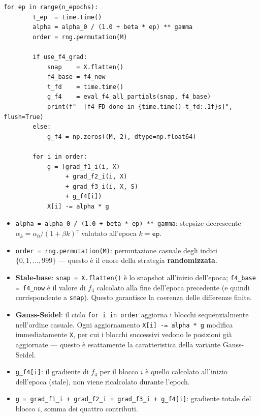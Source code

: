 \documentclass[12pt,a4paper]{article}
\theoremstyle{definition}
\begin{document}
\begin{lstlisting}[caption={Righe 269–290 — Loop principale: un'epoca}]
    for ep in range(n_epochs):
        t_ep  = time.time()
        alpha = alpha_0 / (1.0 + beta * ep) ** gamma
        order = rng.permutation(M)

        if use_f4_grad:
            snap    = X.flatten()
            f4_base = f4_now
            t_fd    = time.time()
            g_f4    = eval_f4_all_partials(snap, f4_base)
            print(f"  [f4 FD done in {time.time()-t_fd:.1f}s]", flush=True)
        else:
            g_f4 = np.zeros((M, 2), dtype=np.float64)

        for i in order:
            g = (grad_f1_i(i, X)
                 + grad_f2_i(i, X)
                 + grad_f3_i(i, X, S)
                 + g_f4[i])
            X[i] -= alpha * g
\end{lstlisting}

\begin{itemize}[nosep]
  \item \texttt{alpha = alpha\_0 / (1.0 + beta * ep) ** gamma}: stepsize decrescente
        $\alpha_k = \alpha_0 / (1 + \beta k)^\gamma$ valutato all'epoca $k = \texttt{ep}$.
  \item \texttt{order = rng.permutation(M)}: permutazione casuale degli indici
        $\{0, 1, \ldots, 999\}$ — questo è il cuore della strategia \textbf{randomizzata}.
  \item \textbf{Stale-base}: \texttt{snap = X.flatten()} è lo snapshot all'inizio dell'epoca;
        \texttt{f4\_base = f4\_now} è il valore di $f_4$ calcolato alla fine dell'epoca precedente
        (e quindi corrispondente a \texttt{snap}). Questo garantisce la coerenza delle differenze
        finite.
  \item \textbf{Gauss-Seidel}: il ciclo \texttt{for i in order} aggiorna i blocchi
        sequenzialmente nell'ordine casuale. Ogni aggiornamento \texttt{X[i] -= alpha * g}
        modifica immediatamente \texttt{X}, per cui i blocchi successivi vedono le posizioni
        già aggiornate — questo è esattamente la caratteristica della variante Gauss-Seidel.
  \item \texttt{g\_f4[i]}: il gradiente di $f_4$ per il blocco $i$ è quello calcolato
        all'inizio dell'epoca (stale), non viene ricalcolato durante l'epoch.
  \item \texttt{g = grad\_f1\_i + grad\_f2\_i + grad\_f3\_i + g\_f4[i]}: gradiente totale
        del blocco $i$, somma dei quattro contributi.
\end{itemize}
\end{document}
